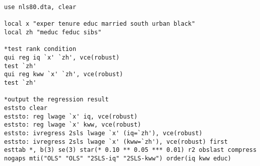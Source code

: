 \begin{lstlisting}
use nls80.dta, clear

local x "exper tenure educ married south urban black"
local zh "meduc feduc sibs"

*test rank condition
qui reg iq `x' `zh', vce(robust)
test `zh'
qui reg kww `x' `zh', vce(robust)
test `zh'

*output the regression result
eststo clear
eststo: reg lwage `x' iq, vce(robust)
eststo: reg lwage `x' kww, vce(robust)
eststo: ivregress 2sls lwage `x' (iq=`zh'), vce(robust)
eststo: ivregress 2sls lwage `x' (kww=`zh'), vce(robust) first
esttab *, b(3) se(3) star(* 0.10 ** 0.05 *** 0.01) r2 obslast compress nogaps mti("OLS" "OLS" "2SLS-iq" "2SLS-kww") order(iq kww educ)
\end{lstlisting}